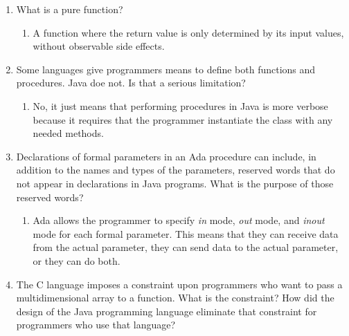 \begin{enumerate}
\begin{answer}
    \end{answer}

  \item What is a pure function?

  
    \begin{answer}

    \begin{enumerate}
    \item A function where the return value is only determined by its input values, without observable side effects. 
    \end{enumerate}

    \end{answer}

  \item Some languages give programmers means to define
    both functions and procedures. Java doe not. Is that
    a serious limitation?

  
    \begin{answer}

    \begin{enumerate}
    \item No, it just means that performing procedures in Java is more 
verbose because it requires that the programmer instantiate the class with any needed methods.
 
    \end{enumerate}

    \end{answer}

  \item Declarations of formal parameters in an Ada procedure
    can include, in addition to the names and types of the
    parameters, reserved words that do not appear in declarations
    in Java programs. 
    What is the purpose of those reserved words?
 
  
    \begin{answer}

    \begin{enumerate}
    \item Ada allows the programmer to specify \textit{in} mode,
 \textit{out} mode, and \textit{inout} mode for each formal parameter.  
This means that they can receive data from the actual parameter, 
they can send data to the actual parameter, or they can do both.
    \end{enumerate}

    \end{answer}

  \item The C language imposes a constraint upon programmers
    who want to pass a multidimensional array to a function.
    What is the constraint? How did the design of the Java
    programming language eliminate that constraint for 
    programmers who use that language?


\end{enumerate}
